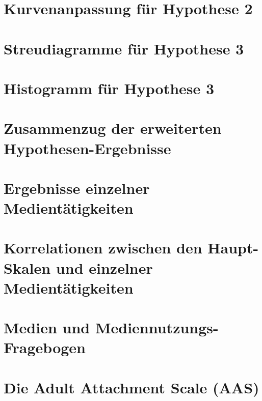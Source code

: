 \section{Kurvenanpassung für Hypothese 2}\label{app:Hypo2_Kurvenanpassung}

\newpage
\section{Streudiagramme für Hypothese 3}\label{app:Hypo3_Streudiagramm}

\newpage
\section{Histogramm für Hypothese 3}\label{app:Hypo3_Histogramm}

\newpage

\section{Zusammenzug der erweiterten Hypothesen-Ergebnisse}\label{app:ZusammenzugResultate}

\newpage

\section{Ergebnisse einzelner Medientätigkeiten}\label{app:ResultateMedientaetigkeiten}

\newpage

\section{Korrelationen zwischen den Haupt-Skalen und einzelner Medientätigkeiten}\label{app:Korrelationen}

\newpage

\section{Medien und Mediennutzungs-Fragebogen}\label{app:MedienFragebogen}

\newpage

\section{Die Adult Attachment Scale (AAS)}\label{app:AAS}

\newpage

